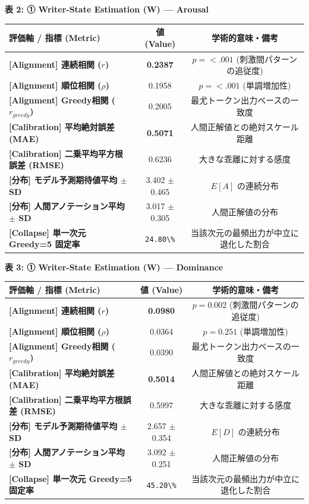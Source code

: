 \textbf{表 2: ① Writer-State Estimation (W) — Arousal}
\begin{center}
\small
\begin{tabular}{lcc}
\toprule
\textbf{評価軸 / 指標 (Metric)} & \textbf{値 (Value)} & \textbf{学術的意味・備考} \\
\midrule
\textbf{[Alignment] 連続相関 ($r$)} & \textbf{0.2387} & $p = <.001 $ (刺激間パターンの追従度) \\
\textbf{[Alignment] 順位相関 ($\rho$)} & 0.1958 & $p = <.001 $ (単調増加性) \\
\textbf{[Alignment] Greedy相関 ($r_{greedy}$)} & 0.2005 & 最尤トークン出力ベースの一致度 \\
\textbf{[Calibration] 平均絶対誤差 (MAE)} & \textbf{0.5071} & 人間正解値との絶対スケール距離 \\
\textbf{[Calibration] 二乗平均平方根誤差 (RMSE)} & 0.6236 & 大きな乖離に対する感度 \\
\textbf{[分布] モデル予測期待値平均 $\pm$ SD} & 3.402 $\pm$ 0.465 & $E[A]$ の連続分布 \\
\textbf{[分布] 人間アノテーション平均 $\pm$ SD} & 3.017 $\pm$ 0.305 & 人間正解値の分布 \\
\textbf{[Collapse] 単一次元 Greedy=5 固定率} & \texttt{24.80\textbackslash{}\%} & 当該次元の最頻出力が中立に退化した割合 \\
\bottomrule
\end{tabular}
\end{center}


\textbf{表 3: ① Writer-State Estimation (W) — Dominance}
\begin{center}
\small
\begin{tabular}{lcc}
\toprule
\textbf{評価軸 / 指標 (Metric)} & \textbf{値 (Value)} & \textbf{学術的意味・備考} \\
\midrule
\textbf{[Alignment] 連続相関 ($r$)} & \textbf{0.0980} & $p = 0.002 $ (刺激間パターンの追従度) \\
\textbf{[Alignment] 順位相関 ($\rho$)} & 0.0364 & $p = 0.251 $ (単調増加性) \\
\textbf{[Alignment] Greedy相関 ($r_{greedy}$)} & 0.0390 & 最尤トークン出力ベースの一致度 \\
\textbf{[Calibration] 平均絶対誤差 (MAE)} & \textbf{0.5014} & 人間正解値との絶対スケール距離 \\
\textbf{[Calibration] 二乗平均平方根誤差 (RMSE)} & 0.5997 & 大きな乖離に対する感度 \\
\textbf{[分布] モデル予測期待値平均 $\pm$ SD} & 2.657 $\pm$ 0.354 & $E[D]$ の連続分布 \\
\textbf{[分布] 人間アノテーション平均 $\pm$ SD} & 3.092 $\pm$ 0.251 & 人間正解値の分布 \\
\textbf{[Collapse] 単一次元 Greedy=5 固定率} & \texttt{45.20\textbackslash{}\%} & 当該次元の最頻出力が中立に退化した割合 \\
\bottomrule
\end{tabular}
\end{center}


